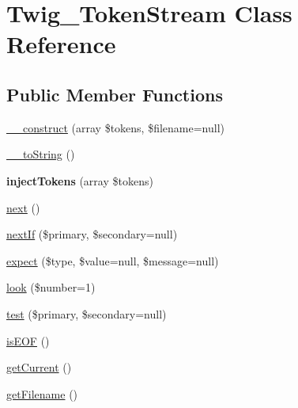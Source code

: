 \hypertarget{class_twig___token_stream}{}\section{Twig\+\_\+\+Token\+Stream Class Reference}
\label{class_twig___token_stream}
\subsection*{Public Member Functions}
\begin{DoxyCompactItemize}
\item 
\hyperlink{class_twig___token_stream_a3a8bc69354b7ccd3ee2fc6d652946c0e}{\+\_\+\+\_\+construct} (array \$tokens, \$filename=null)
\item 
\hyperlink{class_twig___token_stream_a7516ca30af0db3cdbf9a7739b48ce91d}{\+\_\+\+\_\+to\+String} ()
\item 
\hypertarget{class_twig___token_stream_a122abdaaaa2c432ded9e8d38dce57255}{}{\bfseries inject\+Tokens} (array \$tokens)\label{class_twig___token_stream_a122abdaaaa2c432ded9e8d38dce57255}

\item 
\hyperlink{class_twig___token_stream_acea62048bfee7b3cd80ed446c86fb78a}{next} ()
\item 
\hyperlink{class_twig___token_stream_a98299de67ed3a15ecfadcbbaade22468}{next\+If} (\$primary, \$secondary=null)
\item 
\hyperlink{class_twig___token_stream_a0da4315fbdc3d46cf3665b4e8ae4bcf9}{expect} (\$type, \$value=null, \$message=null)
\item 
\hyperlink{class_twig___token_stream_a280a97f330083ec9d437c362e3406cf4}{look} (\$number=1)
\item 
\hyperlink{class_twig___token_stream_a9467b43d6c92b7033f09a94f9c7266d6}{test} (\$primary, \$secondary=null)
\item 
\hyperlink{class_twig___token_stream_afea23cbffd2f62df19df9b394f77dee5}{is\+E\+O\+F} ()
\item 
\hyperlink{class_twig___token_stream_ad926899d7cac34a3f1a90e552d8eb27d}{get\+Current} ()
\item 
\hyperlink{class_twig___token_stream_a2982abe8d7b767602a1485dfb4cf653d}{get\+Filename} ()
\end{DoxyCompactItemize}
